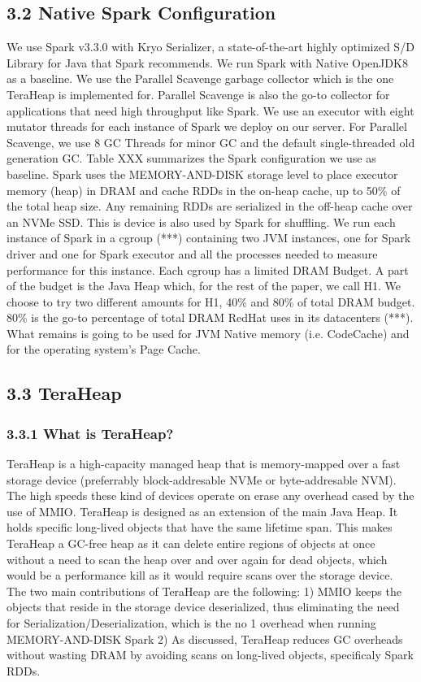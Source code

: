 \documentclass[twocolumn,10pt]{asme2e}
\begin{document}
\subsection*{3.2 Native Spark Configuration}
We use Spark v3.3.0 with Kryo Serializer, a state-of-the-art highly optimized S/D Library for Java that Spark recommends. We run Spark with Native OpenJDK8 as a baseline. We use the Parallel Scavenge garbage collector which is the one TeraHeap is implemented for. Parallel Scavenge is also the go-to collector for applications that need high throughput like Spark. We use an executor with eight mutator threads for each instance of Spark we deploy on our server. For Parallel Scavenge, we use 8 GC Threads for minor GC and the default single-threaded old generation GC. Table XXX summarizes the Spark configuration we use as baseline. Spark uses the MEMORY-AND-DISK storage level to place executor memory (heap) in DRAM and cache RDDs in the on-heap cache, up to 50\% of the total heap size. Any remaining RDDs are serialized in the off-heap cache over an NVMe SSD. This is device is also used by Spark for shuffling. We run each instance of Spark in a cgroup (***) containing two JVM instances, one for Spark driver and one for Spark executor and all the processes needed to measure performance for this instance. Each cgroup has a limited DRAM Budget. A part of the budget is the Java Heap which, for the rest of the paper, we call H1. We choose to try two different amounts for H1, 40\% and 80\% of total DRAM budget. 80\% is the go-to percentage of total DRAM RedHat uses in its datacenters (***). What remains is going to be used for JVM Native memory (i.e. CodeCache) and for the operating system's Page Cache.   

\subsection*{3.3 TeraHeap}
\subsubsection*{3.3.1 What is TeraHeap?}
TeraHeap is a high-capacity managed heap that is memory-mapped over a fast storage device (preferrably block-addresable NVMe or byte-addresable NVM). The high speeds these kind of devices operate on erase any overhead cased by the use of MMIO. TeraHeap is designed as an extension of the main Java Heap. It holds specific long-lived objects that have the same lifetime span. This makes TeraHeap a GC-free heap as it can delete entire regions of objects at once without a need to scan the heap over and over again for dead objects, which would be a performance kill as it would require scans over the storage device. The two main contributions of TeraHeap are the following: 1) MMIO keeps the objects that reside in the storage device deserialized, thus eliminating the need for Serialization/Deserialization, which is the no 1 overhead when running MEMORY-AND-DISK Spark 2) As discussed, TeraHeap reduces GC overheads without wasting DRAM by avoiding scans on long-lived objects, specificaly Spark RDDs.
\end{document}
